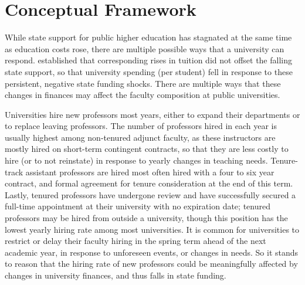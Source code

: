 \section{Conceptual Framework}
\label{sec:conceptual}

While state support for public higher education has stagnated at the same time as education costs rose, there are multiple possible ways that a university can respond.
\cite{NBERw23736} established that corresponding rises in tuition did not offset the falling state support, so that university spending (per student) fell in response to these persistent, negative state funding shocks.
There are multiple ways that these changes in finances may affect the faculty composition at public universities.

Universities hire new professors most years, either to expand their departments or to replace leaving professors.
The number of professors hired in each year is usually highest among non-tenured adjunct faculty, as these instructors are mostly hired on short-term contingent contracts, so that they are less costly to hire (or to not reinstate) in response to yearly changes in teaching needs.
Tenure-track assistant professors are hired most often hired with a four to six year contract, and formal agreement for tenure consideration at the end of this term.
Lastly, tenured professors have undergone review and have successfully secured a full-time appointment at their university with no expiration date; tenured professors may be hired from outside a university, though this position has the lowest yearly hiring rate among most universities.
It is common for universities to restrict or delay their faculty hiring in the spring term ahead of the next academic year, in response to unforeseen events, or changes in needs.
So it stands to reason that the hiring rate of new professors could be meaningfully affected by changes in university finances, and thus falls in state funding.

